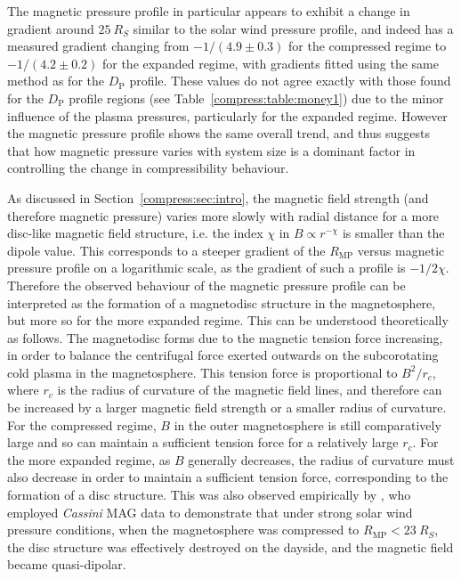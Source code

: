 The magnetic pressure profile in particular appears to exhibit a change in gradient around $\SI{25}{R_S}$ similar to the solar wind pressure profile, and indeed has a measured gradient changing from $-1/(4.9 \pm 0.3)$ for the compressed regime to $ -1/(4.2 \pm 0.2)$ for the expanded regime, with gradients fitted using the same method as for the $D_\mathrm{P}$ profile. These values do not agree exactly with those found for the $D_\mathrm{P}$ profile regions (see Table~\ref{compress:table:money1}) due to the minor influence of the plasma pressures, particularly for the expanded regime. However the magnetic pressure profile shows the same overall trend, and thus suggests that how magnetic pressure varies with system size is a dominant factor in controlling the change in compressibility behaviour.
 
As discussed in Section~\ref{compress:sec:intro}, the magnetic field strength (and therefore magnetic pressure) varies more slowly with radial distance for a more disc-like magnetic field structure, i.e. the index $\chi$ in $B \propto r^{-\chi}$ is smaller than the dipole value. This corresponds to a steeper gradient of the $R_\mathrm{MP}$ versus magnetic pressure profile on a logarithmic scale, as the gradient of such a profile is $-1/2\chi$. Therefore the observed behaviour of the magnetic pressure profile can be interpreted as the formation of a magnetodisc structure in the magnetosphere, but more so for the more expanded regime. This can be understood theoretically as follows. The magnetodisc forms due to the magnetic tension force increasing, in order to balance the centrifugal force exerted outwards on the subcorotating cold plasma in the magnetosphere. This tension force is proportional to $B^2/r_c$, where $r_c$ is the radius of curvature of the magnetic field lines, and therefore can be increased by a larger magnetic field strength or a smaller radius of curvature. For the compressed regime, $B$ in the outer magnetosphere is still comparatively large and so can maintain a sufficient tension force for a relatively large $r_c$. For the more expanded regime, as $B$ generally decreases, the radius of curvature must also decrease in order to maintain a sufficient tension force, corresponding to the formation of a disc structure. This was also observed empirically by \citet{arridge2008}, who employed \textit{Cassini} MAG data to demonstrate that under strong solar wind pressure conditions, when the magnetosphere was compressed to $R_\mathrm{MP} < \SI{23}{R_S}$, the disc structure was effectively destroyed on the dayside, and the magnetic field became quasi-dipolar.

